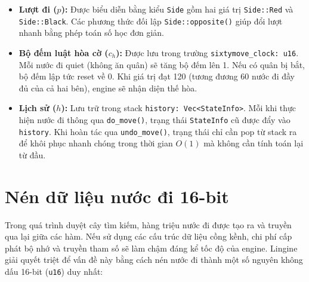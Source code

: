 \begin{itemize}
    \item \textbf{Lượt đi ($p$):} Được biểu diễn bằng kiểu \texttt{Side} gồm hai giá trị \texttt{Side::Red} và \texttt{Side::Black}. Các phương thức đối lập \texttt{Side::opposite()} giúp đổi lượt nhanh bằng phép toán số học đơn giản.
    \item \textbf{Bộ đếm luật hòa cờ ($c_h$):} Được lưu trong trường \texttt{sixtymove\_clock: u16}. Mỗi nước đi quiet (không ăn quân) sẽ tăng bộ đếm lên 1. Nếu có quân bị bắt, bộ đếm lập tức reset về 0. Khi giá trị đạt 120 (tương đương 60 nước đi đầy đủ của cả hai bên), engine sẽ nhận diện thế hòa.
    \item \textbf{Lịch sử ($h$):} Lưu trữ trong stack \texttt{history: Vec<StateInfo>}. Mỗi khi thực hiện nước đi thông qua \texttt{do\_move()}, trạng thái \texttt{StateInfo} cũ được đẩy vào \texttt{history}. Khi hoàn tác qua \texttt{undo\_move()}, trạng thái chỉ cần pop từ stack ra để khôi phục nhanh chóng trong thời gian $O(1)$ mà không cần tính toán lại từ đầu.
\end{itemize}

\section{Nén dữ liệu nước đi 16-bit}

Trong quá trình duyệt cây tìm kiếm, hàng triệu nước đi được tạo ra và truyền qua lại giữa các hàm. Nếu sử dụng các cấu trúc dữ liệu cồng kềnh, chi phí cấp phát bộ nhớ và truyền tham số sẽ làm chậm đáng kể tốc độ của engine. Lingine giải quyết triệt để vấn đề này bằng cách nén nước đi thành một số nguyên không dấu 16-bit (\texttt{u16}) duy nhất:

